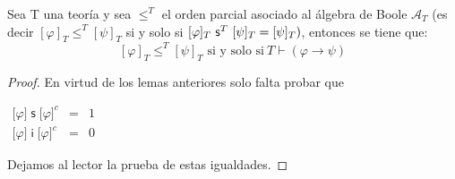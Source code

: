   \begin{lemma} \label{lemma_77}
    \PN Sea T una teoría y sea $\leq^{T}$ el orden parcial asociado al álgebra de Boole $\mathcal{A}_{T}$ (es decir
    $[\varphi]_{T} \leq^{T} [\psi]_{T}$ si y solo si $[\varphi]_{T} \ \SU^{T} \ [\psi]_{T} = [\psi]_{T})$, entonces se
    tiene que:
    \[
      [\varphi]_{T} \leq^{T} [\psi]_{T} \text{ si y solo si} \ T \vdash (\varphi \rightarrow \psi)
    \]
  \end{lemma}
  \begin{proof}
    En virtud de los lemas anteriores solo falta probar que

    $\displaystyle \begin{array}{rcl} \lbrack \varphi \rbrack\;\mathsf{s}\;\lbrack\varphi \rbrack^{c} & =& 1 \\ \lbrack \varphi \rbrack\;\mathsf{i}\;\lbrack\varphi \rbrack^{c} & =& 0 \end{array} $

    Dejamos al lector la prueba de estas igualdades.
  \end{proof}

